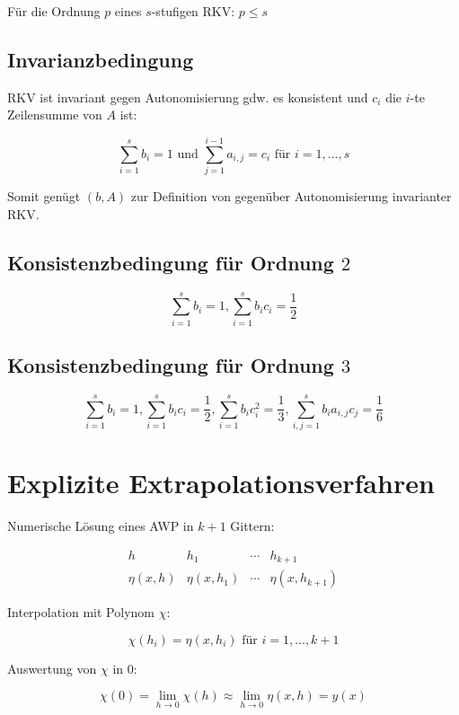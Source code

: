 Für die Ordnung $p$ eines $s$-stufigen RKV: $p \leq s$

\subsection*{Invarianzbedingung}

RKV ist invariant gegen Autonomisierung gdw. es konsistent und $c_i$ die $i$-te Zeilensumme von $A$ ist:

\[ \sum_{i=1}^s b_i = 1 \text{ und } \sum_{j=1}^{i-1} a_{i,j} = c_i \text{ für } i=1,\dots,s \]

Somit genügt $(b, A)$ zur Definition von gegenüber Autonomisierung invarianter RKV.

\subsection*{Konsistenzbedingung für Ordnung $2$}

\[ \sum_{i=1}^s b_i = 1 , \sum_{i=1}^s b_i c_i = \frac{1}{2} \]

\subsection*{Konsistenzbedingung für Ordnung $3$}

\[ \sum_{i=1}^s b_i = 1 , \sum_{i=1}^s b_i c_i = \frac{1}{2} , \sum_{i=1}^s b_i c_i^2 = \frac{1}{3} , \sum_{i,j=1}^s b_i a_{i,j} c_j = \frac{1}{6} \]

\section*{Explizite Extrapolationsverfahren}

Numerische Lösung eines AWP in $k+1$ Gittern:

\[ \begin{array}{c|ccc}
h & h_1 & \cdots & h_{k+1} \\
\hline
\eta(x,h) & \eta(x,h_1) & \cdots & \eta(x,h_{k+1})
\end{array} \]

Interpolation mit Polynom $\chi$:

\vspace*{-2mm}
\[ \chi(h_i) = \eta(x,h_i) \text{ für } i=1,\dots,k+1 \]

Auswertung von $\chi$ in $0$:

\vspace*{-2mm}
\[ \chi(0) = \lim_{h \to 0} \chi(h) \approx \lim_{h \to 0} \eta(x,h) = y(x) \]

